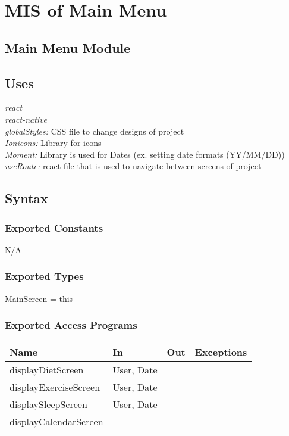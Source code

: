\documentclass[12pt, titlepage]{article}
\begin{document}
\section{MIS of Main Menu} \label{Module} 

\subsection{Main Menu Module}

\subsection{Uses}
{\textit{react}}\\
{\textit{react-native}}\\
{\textit{globalStyles:} CSS file to change designs of project}\\
{\textit{Ionicons:} Library for icons}\\
{\textit{Moment:} Library is used for Dates (ex. setting date formats (YY/MM/DD))}\\
{\textit{useRoute:} react file that is used to navigate between screens of project}\\

\subsection{Syntax}

\subsubsection{Exported Constants}
N/A

\subsubsection{Exported Types}
MainScreen = this

\subsubsection{Exported Access Programs}

\begin{tabular}{| l | l | l | l |}
	\hline
	{\textbf{Name}} & {\textbf{In}} & {\textbf{Out}} & {\textbf{Exceptions}}\\
	\hline
	{displayDietScreen} & User, Date & & \\
	\hline
	{displayExerciseScreen} & User, Date & & \\
	\hline
	{displaySleepScreen} & User, Date & & \\
	\hline
	{displayCalendarScreen} & & & \\
	\hline
\end{tabular}
\end{document}
